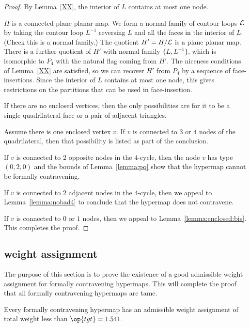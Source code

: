 \begin{proof}
By Lemma~\ref{XX}, the interior of $L$ contains at most one node.

$H$ is a connected plane planar map.  We form a normal family of
contour loops ${\cal L}$ by taking the contour loop $L^{-1}$
reversing $L$ and all the faces in the interior of $L$.
(Check this is a normal family.)  The quotient $H' = H/{\cal L}$ is
a plane planar map.  There is a further quotient of $H'$ with normal
family $\{L,L^{-1}\}$, which is isomorphic to $P_4$ with the natural
flag coming from $H'$.  The niceness conditions of Lemma~\ref{XX} are
satisfied, so we can recover $H'$ from $P_4$ by a sequence of
face-insertions.  Since the interior of $L$ contains at most one
node, this gives restrictions on the partitions that can be used in
face-insertion.

If there are no enclosed vertices, then the only possibilities are
for it to be a single quadrilateral face or a pair of adjacent
triangles.

Assume there is one enclosed vertex $v$.  If $v$ is connected to $3$
or $4$ nodes of the quadrilateral, then that possibility is listed
as part of the conclusion.

If $v$ is connected to $2$ opposite nodes in the $4$-cycle, then the
node $v$ has type $(0,2,0)$ and the bounds of
Lemma~\ref{lemma:pq} show that the hypermap cannot be formally
contravening.

If $v$ is connected to $2$ adjacent nodes in the $4$-cycle, then we
appeal to Lemma~\ref{lemma:nobad4} to conclude that the hypermap
does not contravene.

If $v$ is connected to $0$ or $1$ nodes, then we appeal to
Lemma~\ref{lemma:enclosed:bis}.  This completes the proof.
\end{proof}

\subsection{weight assignment}
    \label{sec:weight}

The purpose of this section is to prove the existence of a good
admissible weight assignment for formally contravening hypermaps.
This will complete the proof that all formally contravening
hypermaps are tame.

\begin{theorem}  Every formally contravening hypermap has an admissible
weight assignment of total weight less than $\op{tgt}=1.541$.
\end{theorem}

